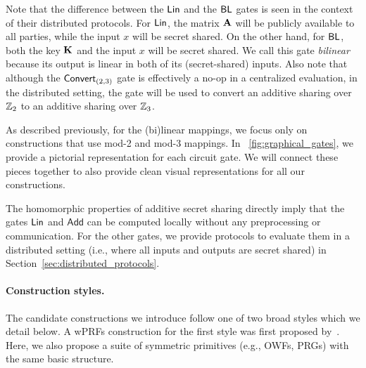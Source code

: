 \noindent Note that the difference between the $\textnormal{\textsf{Lin}}$ and the $\textnormal{\textsf{BL}}$ gates is seen in the context of their distributed protocols. For $\textnormal{\textsf{Lin}}$, the matrix $\mat{A}$ will be publicly available to all parties, while the input $x$ will be secret shared. On the other hand, for $\textnormal{\textsf{BL}}$, both the key $\mat{K}$ and the input $x$ will be secret shared. We call this gate \textit{bilinear} because its output is linear in both of its (secret-shared) inputs. Also note that although the $\textnormal{\textsf{Convert}}_{(2,3)}$ gate is effectively a no-op in a centralized evaluation, in the distributed setting, the gate will be used to convert an additive sharing over $\mathbb{Z}_2$ to an additive sharing over $\mathbb{Z}_3$.

As described previously, for the (bi)linear mappings, we focus only on constructions that use mod-2 and mod-3 mappings. In \fig~\ref{fig:graphical_gates}, we provide a pictorial representation for each circuit gate. We will connect these pieces together to also provide clean visual representations for all our constructions. 

The homomorphic properties of additive secret sharing directly imply that the gates $\textnormal{\textsf{Lin}}$ and $\textsf{Add}$ can be computed locally without any preprocessing or communication. For the other gates, we provide protocols to evaluate them in a distributed setting (i.e., where all inputs and outputs are secret shared) in Section~\ref{sec:distributed_protocols}.




\paragraph{Construction styles.}
The candidate constructions we introduce follow one of two broad styles which we detail below. A wPRFs construction for the first style was first proposed by~\cite{boneh2018-darkmatter}. Here, we also propose a suite of symmetric primitives (e.g., OWFs, PRGs) with the same basic structure.

